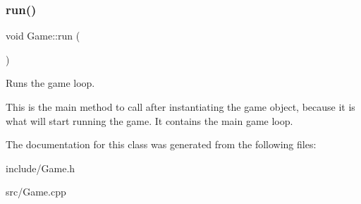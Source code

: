 \subsubsection{\texorpdfstring{run()}{run()}}
{\footnotesize\ttfamily void Game\+::run (\begin{DoxyParamCaption}{ }\end{DoxyParamCaption})}



Runs the game loop. 

This is the main method to call after instantiating the game object, because it is what will start running the game. It contains the main game loop. 

The documentation for this class was generated from the following files\+:\begin{DoxyCompactItemize}
\item 
include/Game.\+h\item 
src/Game.\+cpp\end{DoxyCompactItemize}
